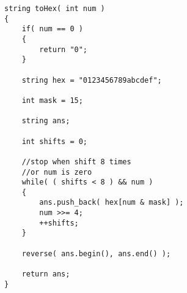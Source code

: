 \setcounter{lstlisting}{0}
\begin{lstlisting}[style=customc, caption={Bit Manipulation}]
string toHex( int num )
{
    if( num == 0 )
    {
        return "0";
    }

    string hex = "0123456789abcdef";

    int mask = 15;

    string ans;

    int shifts = 0;

    //stop when shift 8 times
    //or num is zero
    while( ( shifts < 8 ) && num )
    {
        ans.push_back( hex[num & mask] );
        num >>= 4;
        ++shifts;
    }

    reverse( ans.begin(), ans.end() );

    return ans;
}
\end{lstlisting}

